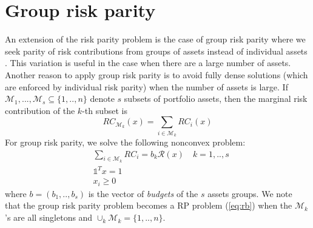 \section{Group risk parity}
An extension of the risk parity problem is the case of group risk parity where we seek parity of risk contributions from groups of assets instead of individual assets \cite{tutuncu}. This variation
is useful in the case when there are a large number of assets. Another reason to apply group risk parity is to avoid fully dense solutions (which are enforced by individual risk parity) when the number of assets is large. If $\mathcal{M}_1, ..., \mathcal{M}_s \subseteq \{1,..,n\}$ denote $s$ subsets of portfolio assets, then the marginal risk contribution of the $k$-th subset is
\begin{equation}
RC_{\mathcal{M}_k}(x) = \sum_{i \in \mathcal{M}_k} RC_i(x)
\end{equation} For group risk parity, we solve the following nonconvex problem:
\begin{equation}
\begin{aligned}
&\sum_{i \in \mathcal{M}_k} RC_i = b_k \mathcal{R}(x) \quad k=1,..,s\\
&\mathds{1}^T x = 1\\
& x_i \geq 0
\end{aligned}
\end{equation}
where $b=(b_1,..,b_s)$ is the vector of \textit{budgets} of the $s$ assets groups. We note that the group risk parity problem becomes a RP problem (\ref{eq:rb}) when the $\mathcal{M}_k$'s are all singletons and $\cup_k \mathcal{M}_k = \{1,..,n\}$.
